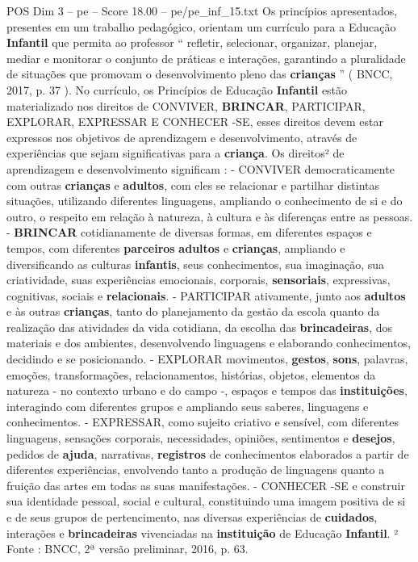 \begin{textsample}{POS Dim 3 – pe – Score 18.00 – pe/pe\_inf\_15.txt}
Os princípios apresentados, presentes em um trabalho pedagógico, orientam um currículo para a Educação \textbf{Infantil} que permita ao professor “ refletir, selecionar, organizar, planejar, mediar e monitorar o conjunto de práticas e interações, garantindo a pluralidade de situações que promovam o desenvolvimento pleno das \textbf{crianças} ” ( BNCC, 2017, p. 37 ).
No currículo, os Princípios de Educação \textbf{Infantil} estão materializado nos direitos de CONVIVER, \textbf{BRINCAR}, PARTICIPAR, EXPLORAR, EXPRESSAR E CONHECER -SE, esses direitos devem estar expressos nos objetivos de aprendizagem e desenvolvimento, através de experiências que sejam significativas para a \textbf{criança}.
Os direitos² de aprendizagem e desenvolvimento significam : - CONVIVER democraticamente com outras \textbf{crianças} e \textbf{adultos}, com eles se relacionar e partilhar distintas situações, utilizando diferentes linguagens, ampliando o conhecimento de si e do outro, o respeito em relação à natureza, à cultura e às diferenças entre as pessoas. - \textbf{BRINCAR} cotidianamente de diversas formas, em diferentes espaços e tempos, com diferentes \textbf{parceiros} \textbf{adultos} e \textbf{crianças}, ampliando e diversificando as culturas \textbf{infantis}, seus conhecimentos, sua imaginação, sua criatividade, suas experiências emocionais, corporais, \textbf{sensoriais}, expressivas, cognitivas, sociais e \textbf{relacionais}. - PARTICIPAR ativamente, junto aos \textbf{adultos} e às outras \textbf{crianças}, tanto do planejamento da gestão da escola quanto da realização das atividades da vida cotidiana, da escolha das \textbf{brincadeiras}, dos materiais e dos ambientes, desenvolvendo linguagens e elaborando conhecimentos, decidindo e se posicionando. - EXPLORAR movimentos, \textbf{gestos}, \textbf{sons}, palavras, emoções, transformações, relacionamentos, histórias, objetos, elementos da natureza - no contexto urbano e do campo -, espaços e tempos das \textbf{instituições}, interagindo com diferentes grupos e ampliando seus saberes, linguagens e conhecimentos. - EXPRESSAR, como sujeito criativo e sensível, com diferentes linguagens, sensações corporais, necessidades, opiniões, sentimentos e \textbf{desejos}, pedidos de \textbf{ajuda}, narrativas, \textbf{registros} de conhecimentos elaborados a partir de diferentes experiências, envolvendo tanto a produção de linguagens quanto a fruição das artes em todas as suas manifestações. - CONHECER -SE e construir sua identidade pessoal, social e cultural, constituindo uma imagem positiva de si e de seus grupos de pertencimento, nas diversas experiências de \textbf{cuidados}, interações e \textbf{brincadeiras} vivenciadas na \textbf{instituição} de Educação \textbf{Infantil}. ² Fonte : BNCC, 2ª versão preliminar, 2016, p. 63.

\end{textsample}
